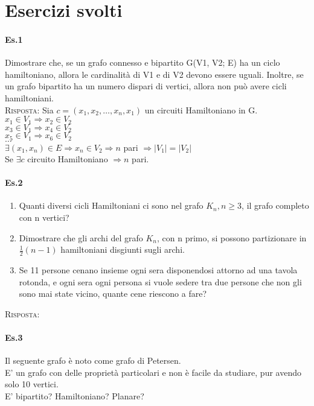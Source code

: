 \section{Esercizi svolti}


\paragraph{Es.1} 
Dimostrare che, se un grafo connesso e bipartito G(V1, V2; E) ha un ciclo hamiltoniano, allora
le cardinalità di V1 e di V2 devono essere uguali.
Inoltre, se un grafo bipartito ha un numero dispari di vertici, allora non può avere cicli
hamiltoniani. \\

\noindent
\textsc{Risposta:} Sia \(c = (x_1, x_2, \dots , x_n, x_1) \) un circuiti Hamiltoniano in G. \\
\(x_1 \in V_1 \Rightarrow x_2 \in V_2\) \\
\(x_3 \in V_1 \Rightarrow x_4 \in V_2\) \\
\(x_5 \in V_1 \Rightarrow x_6 \in V_2\) \\
$\dots$ \\
\(\exists (x_1,x_n) \in E \Rightarrow x_n \in V_2 \Rightarrow n\) pari \(\Rightarrow |V_1| = |V_2| \) \\
Se \(\exists c\) circuito Hamiltoniano $\Rightarrow n$ pari. 

\paragraph{Es.2}
\begin{enumerate}
    \item Quanti diversi cicli Hamiltoniani ci sono nel grafo \(K_n, n \geq 3\), il grafo completo con n vertici?
    \item Dimostrare che gli archi del grafo \(K_n\), con n primo, si possono partizionare in \(\frac{1}{2}(n-1)\) hamiltoniani disgiunti sugli archi.
    \item Se 11 persone cenano insieme ogni sera disponendosi attorno ad una tavola rotonda, e ogni
    sera ogni persona si vuole sedere tra due persone che non gli sono mai state vicino, quante cene
    riescono a fare?
\end{enumerate}
\textsc{Risposta:}

\paragraph{Es.3} Il seguente grafo è noto come grafo di Petersen.\\
E' un grafo con delle proprietà particolari e non è facile da studiare, pur avendo solo 10 vertici. \\
E' bipartito? Hamiltoniano? Planare? \\

